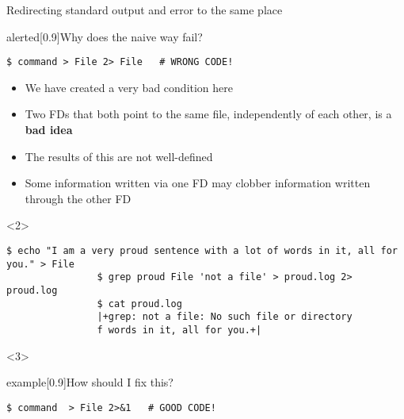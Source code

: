 \begin{frame}[fragile]{Redirecting standard output and error to the same place}
    \vspace{-7mm}
    \begin{overlayarea}{\textwidth}{0.5\textheight}
        \begin{varblock}{alerted}[0.9\textwidth]{Why does the naive way fail?}
            \begin{lstlisting}[style=MyBash, numbers=none, aboveskip=2mm, belowskip=-5mm]
                $ command > File 2> File   # WRONG CODE!
            \end{lstlisting}
        \end{varblock}
        \begin{itemize}[<only@1>]
            \item We have created a very bad condition here
            \item Two FDs that both point to the same file, independently of each other, is a \textbf{bad idea}
            \item The results of this are not well-defined
            \item Some information written via one FD may clobber information written through the other FD\\[-0.5em]
        \end{itemize}
        \begin{onlyenv}<2>
            \begin{lstlisting}[style=MyBash, numbers=none, aboveskip=0pt]
                $ echo "I am a very proud sentence with a lot of words in it, all for you." > File
                $ grep proud File 'not a file' > proud.log 2> proud.log
                $ cat proud.log
                |+grep: not a file: No such file or directory
                f words in it, all for you.+|
            \end{lstlisting}
        \end{onlyenv}
        \begin{onlyenv}<3>
            \vspace{-2mm}
            \begin{varblock}{example}[0.9\textwidth]{How should I fix this?}
                \begin{lstlisting}[style=MyBash, numbers=none, aboveskip=2mm, belowskip=-5mm, xleftmargin=3mm, xrightmargin=3mm]
                    $ command  > File 2>&1   # GOOD CODE!

\end{lstlisting}
\end{varblock}
\end{onlyenv}
\end{overlayarea}
\end{frame}
